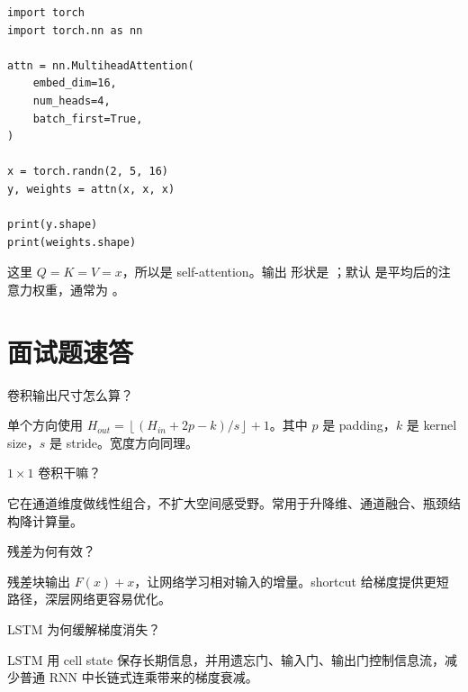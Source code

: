 \begin{lstlisting}
import torch
import torch.nn as nn

attn = nn.MultiheadAttention(
    embed_dim=16,
    num_heads=4,
    batch_first=True,
)

x = torch.randn(2, 5, 16)
y, weights = attn(x, x, x)

print(y.shape)
print(weights.shape)
\end{lstlisting}

这里 \(Q=K=V=x\)，所以是 self-attention。输出  形状是 \code{[2, 5, 16]}；默认  是平均后的注意力权重，通常为 。

\section{面试题速答}

\begin{interview}
卷积输出尺寸怎么算？
\end{interview}

\begin{answer}
单个方向使用 \(H_{out}=\left\lfloor (H_{in}+2p-k)/s \right\rfloor +1\)。其中 \(p\) 是 padding，\(k\) 是 kernel size，\(s\) 是 stride。宽度方向同理。
\end{answer}

\begin{interview}
\(1\times 1\) 卷积干嘛？
\end{interview}

\begin{answer}
它在通道维度做线性组合，不扩大空间感受野。常用于升降维、通道融合、瓶颈结构降计算量。
\end{answer}

\begin{interview}
残差为何有效？
\end{interview}

\begin{answer}
残差块输出 \(F(x)+x\)，让网络学习相对输入的增量。shortcut 给梯度提供更短路径，深层网络更容易优化。
\end{answer}

\begin{interview}
LSTM 为何缓解梯度消失？
\end{interview}

\begin{answer}
LSTM 用 cell state 保存长期信息，并用遗忘门、输入门、输出门控制信息流，减少普通 RNN 中长链式连乘带来的梯度衰减。
\end{answer}

